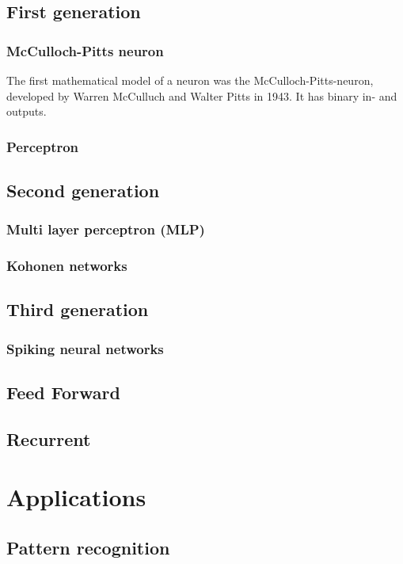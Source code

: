 \documentclass[10pt,a4paper,DIV=11]{scrreprt}
\begin{document}
\subsection{First generation}

\subsubsection{McCulloch-Pitts neuron}
The first mathematical model of a neuron was the McCulloch-Pitts-neuron,
developed by Warren McCulluch and Walter Pitts in 1943. It has binary in- and outputs.

\subsubsection{Perceptron}


\subsection{Second generation}

\subsubsection{Multi layer perceptron (MLP)}
\subsubsection{Kohonen networks}

\subsection{Third generation}
\subsubsection{Spiking neural networks}

\subsection{Feed Forward}
\subsection{Recurrent}

\section{Applications}
\subsection{Pattern recognition}
\end{document}
